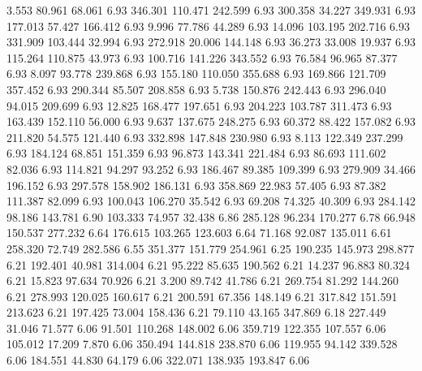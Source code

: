    3.553   80.961   68.061         6.93
 346.301  110.471  242.599         6.93
 300.358   34.227  349.931         6.93
 177.013   57.427  166.412         6.93
   9.996   77.786   44.289         6.93
  14.096  103.195  202.716         6.93
 331.909  103.444   32.994         6.93
 272.918   20.006  144.148         6.93
  36.273   33.008   19.937         6.93
 115.264  110.875   43.973         6.93
 100.716  141.226  343.552         6.93
  76.584   96.965   87.377         6.93
   8.097   93.778  239.868         6.93
 155.180  110.050  355.688         6.93
 169.866  121.709  357.452         6.93
 290.344   85.507  208.858         6.93
   5.738  150.876  242.443         6.93
 296.040   94.015  209.699         6.93
  12.825  168.477  197.651         6.93
 204.223  103.787  311.473         6.93
 163.439  152.110   56.000         6.93
   9.637  137.675  248.275         6.93
  60.372   88.422  157.082         6.93
 211.820   54.575  121.440         6.93
 332.898  147.848  230.980         6.93
   8.113  122.349  237.299         6.93
 184.124   68.851  151.359         6.93
  96.873  143.341  221.484         6.93
  86.693  111.602   82.036         6.93
 114.821   94.297   93.252         6.93
 186.467   89.385  109.399         6.93
 279.909   34.466  196.152         6.93
 297.578  158.902  186.131         6.93
 358.869   22.983   57.405         6.93
  87.382  111.387   82.099         6.93
 100.043  106.270   35.542         6.93
  69.208   74.325   40.309         6.93
 284.142   98.186  143.781         6.90
 103.333   74.957   32.438         6.86
 285.128   96.234  170.277         6.78
  66.948  150.537  277.232         6.64
 176.615  103.265  123.603         6.64
  71.168   92.087  135.011         6.61
 258.320   72.749  282.586         6.55
 351.377  151.779  254.961         6.25
 190.235  145.973  298.877         6.21
 192.401   40.981  314.004         6.21
  95.222   85.635  190.562         6.21
  14.237   96.883   80.324         6.21
  15.823   97.634   70.926         6.21
   3.200   89.742   41.786         6.21
 269.754   81.292  144.260         6.21
 278.993  120.025  160.617         6.21
 200.591   67.356  148.149         6.21
 317.842  151.591  213.623         6.21
 197.425   73.004  158.436         6.21
  79.110   43.165  347.869         6.18
 227.449   31.046   71.577         6.06
  91.501  110.268  148.002         6.06
 359.719  122.355  107.557         6.06
 105.012   17.209    7.870         6.06
 350.494  144.818  238.870         6.06
 119.955   94.142  339.528         6.06
 184.551   44.830   64.179         6.06
 322.071  138.935  193.847         6.06
